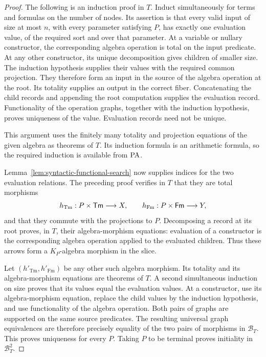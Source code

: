 \begin{proof}
The following is an induction proof in $T$. Induct simultaneously
for terms and formulas on the number of nodes. Its assertion is
that every valid input of size at most $n$, with every parameter
satisfying $P$, has exactly one evaluation value, of the required
sort and over that parameter. At a variable or nullary constructor,
the corresponding algebra operation is total on the input
predicate. At any other constructor, its unique decomposition gives
children of smaller size. The induction hypothesis supplies their
values with the required common projection. They therefore form
an input in the source of the algebra operation at the root.
Its totality supplies an output in the correct fiber. Concatenating
the child records and appending the root computation supplies
the evaluation record. Functionality of the operation graphs,
together with the induction hypothesis, proves uniqueness of the
value. Evaluation records need not be unique.

This argument uses the finitely many totality and projection
equations of the given algebra as theorems of $T$. Its induction formula is an arithmetic formula, so the required
induction is available from $\mathrm{PA}$.

Lemma~\ref{lem:syntactic-functional-search} now supplies indices for
the two evaluation relations. The preceding proof verifies in $T$
that they are total morphisms
\[
 h_{\mathrm{Tm}}:P\times\mathsf{Tm}\longrightarrow X,
 \qquad
 h_{\mathrm{Fm}}:P\times\mathsf{Fm}\longrightarrow Y,
\]
and that they commute with the projections to $P$. Decomposing a
record at its root proves, in $T$, their algebra-morphism
equations: evaluation of a constructor is the corresponding algebra
operation applied to the evaluated children. Thus these arrows form
a $K_P$-algebra morphism in the slice.

Let $(h'_{\mathrm{Tm}},h'_{\mathrm{Fm}})$ be any other such algebra
morphism. Its totality and its algebra-morphism equations are
theorems of $T$. A second simultaneous induction on size proves
that its values equal the evaluation values. At a constructor,
use its algebra-morphism equation, replace the child values by the
induction hypothesis, and use functionality of the algebra
operation. Both pairs of graphs are supported on the same source
predicates. The resulting universal graph equivalences are
therefore precisely equality of the two pairs of morphisms in
$\mathcal B_T$. This proves uniqueness for every $P$. Taking $P$
to be terminal proves initiality in $\mathcal B_T^2$.
\end{proof}

